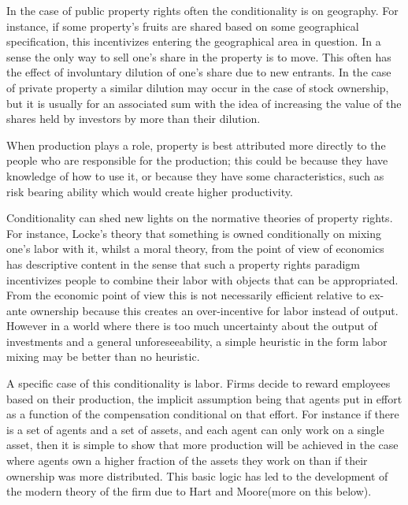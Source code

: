 \documentclass[12pt]{article}
\numberwithin{equation}{section}
\begin{document}
In the case of public property rights often the conditionality is on geography. For instance, if some property's fruits are shared based on some geographical specification, this incentivizes entering the geographical area in question. In a sense the only way to sell one's share in the property is to move. This often has the effect of involuntary dilution of one's share due to new entrants. In the case of private property a similar dilution may occur in the case of stock ownership, but it is usually for an associated sum with the idea of increasing the value of the shares held by investors by more than their dilution.

When production plays a role, property is best attributed more directly to the people who are responsible for the production; this could be because they have knowledge of how to use it, or because they have some characteristics, such as risk bearing ability which would create higher productivity.

Conditionality can shed new lights on the normative theories of property rights. For instance, Locke's theory that something is owned conditionally on mixing one's labor with it, whilst a moral theory, from the point of view of economics has descriptive content in the sense that such a property rights paradigm incentivizes people to combine their labor with objects that can be appropriated. From the economic point of view this is not necessarily efficient relative to ex-ante ownership because this creates an over-incentive for labor instead of output. However in a world where there is too much uncertainty about the output of investments and a general unforeseeability, a simple heuristic in the form labor mixing may be better than no heuristic.

A specific case of this conditionality is labor. Firms decide to reward employees based on their production, the implicit assumption being that agents put in effort as a function of the compensation conditional on that effort. For instance if there is a set of agents and a set of assets, and each agent can only work on a single asset, then it is simple to show that more production will be achieved in the case where agents own a higher fraction of the assets they work on than if their ownership was more distributed. This basic logic has led to the development of the modern theory of the firm due to Hart and Moore(more on this below).
\end{document}
